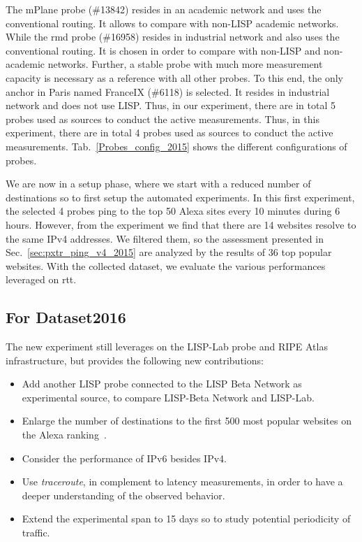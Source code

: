 The mPlane probe (\#13842) resides in an academic network and uses the conventional routing. It allows to compare with non-LISP academic networks. While the rmd probe (\#16958) resides in industrial network and also uses the conventional routing. It is chosen in order to compare with non-LISP and non-academic networks. Further, a stable probe with much more measurement capacity is necessary as a reference with all other probes. To this end, the only anchor in Paris named FranceIX (\#6118) is selected. It resides in industrial network and does not use LISP. Thus, in our experiment, there are in total 5 probes used as sources to conduct the active measurements. Thus, in this experiment, there are in total 4 probes used as sources to conduct the active measurements. Tab.~\ref{Probes_config_2015} shows the different configurations of probes.

We are now in a setup phase, where we start with a reduced number of destinations so to first setup the automated experiments. In this first experiment, the selected 4 probes ping to the top 50 Alexa sites every 10 minutes during 6 hours. However, from the experiment we find that there are 14 websites resolve to the same IPv4 addresses. We filtered them, so the assessment presented in Sec.~\ref{sec:pxtr_ping_v4_2015} are analyzed by the results of 36 top popular websites. With the collected dataset, we evaluate the various performances leveraged on \acrshort{rtt}.

\subsection{For Dataset2016}
\label{sec:pxtr_meth_2016}
The new experiment still leverages on the LISP-Lab probe and RIPE Atlas infrastructure, but provides the following new contributions:
\begin{itemize}[noitemsep,topsep=0pt]
    \item Add another LISP probe connected to the LISP Beta Network as experimental source, to compare LISP-Beta Network and LISP-Lab.
    \item Enlarge the number of destinations to the first 500 most popular websites on the Alexa ranking~\cite{alexa}.
    \item Consider the performance of IPv6 besides IPv4.
    \item Use \emph{traceroute}, in complement to latency measurements, in order to have a deeper understanding of the observed behavior.
    \item Extend the experimental span to 15 days so to study potential periodicity of traffic.
\end{itemize}

